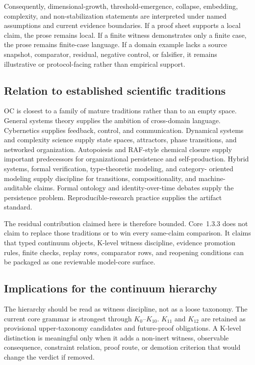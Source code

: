 Consequently, dimensional-growth, threshold-emergence, collapse, embedding,
complexity, and non-stabilization statements are interpreted under named
assumptions and current evidence boundaries. If a proof sheet supports a local
claim, the prose remains local. If a finite witness demonstrates only a finite
case, the prose remains finite-case language. If a domain example lacks a
source snapshot, comparator, residual, negative control, or falsifier, it
remains illustrative or protocol-facing rather than empirical support.

\subsection{Relation to established scientific traditions}

OC is closest to a family of mature traditions rather than to an empty space.
General systems theory supplies the ambition of cross-domain language.
Cybernetics supplies feedback, control, and communication. Dynamical systems
and complexity science supply state spaces, attractors, phase transitions, and
networked organization. Autopoiesis and RAF-style chemical closure supply
important predecessors for organizational persistence and self-production.
Hybrid systems, formal verification, type-theoretic modeling, and category-
oriented modeling supply discipline for transitions, compositionality, and
machine-auditable claims. Formal ontology and identity-over-time debates supply
the persistence problem. Reproducible-research practice supplies the artifact
standard.

The residual contribution claimed here is therefore bounded. Core~1.3.3 does
not claim to replace those traditions or to win every same-claim comparison. It
claims that typed continuum objects, K-level witness discipline, evidence
promotion rules, finite checks, replay rows, comparator rows, and reopening
conditions can be packaged as one reviewable model-core surface.

\subsection{Implications for the continuum hierarchy}

The hierarchy should be read as witness discipline, not as a loose taxonomy.
The current core grammar is strongest through \(K_0\)--\(K_{10}\). \(K_{11}\)
and \(K_{12}\) are retained as provisional upper-taxonomy candidates and
future-proof obligations. A K-level distinction is meaningful only when it adds
a non-inert witness, observable consequence, constraint relation, proof route,
or demotion criterion that would change the verdict if removed.

